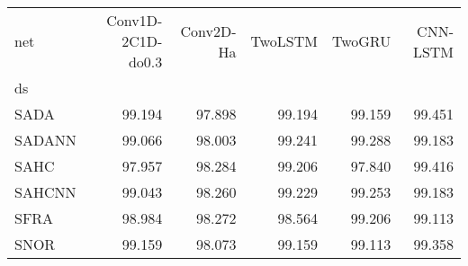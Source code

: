 \begin{tabular}{lrrrrr}
\toprule
net &  Conv1D-2C1D-do0.3 &  Conv2D-Ha &  TwoLSTM &  TwoGRU &  CNN-LSTM \\
ds     &                    &            &          &         &           \\
\midrule
SADA   &             99.194 &     97.898 &   99.194 &  99.159 &    99.451 \\
SADANN &             99.066 &     98.003 &   99.241 &  99.288 &    99.183 \\
SAHC   &             97.957 &     98.284 &   99.206 &  97.840 &    99.416 \\
SAHCNN &             99.043 &     98.260 &   99.229 &  99.253 &    99.183 \\
SFRA   &             98.984 &     98.272 &   98.564 &  99.206 &    99.113 \\
SNOR   &             99.159 &     98.073 &   99.159 &  99.113 &    99.358 \\
\bottomrule
\end{tabular}
